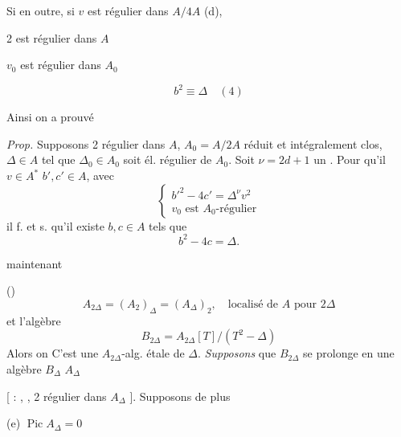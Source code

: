 \documentclass[11pt,a4paper]{article}
\begin{document}
Si en outre, si  $v$  est régulier dans $A/4A$ (d), \struck{\ill{}}

2 est régulier dans $A$

$v_0$ est régulier dans $A_0$


\[
  b^2 \equiv \Delta \quad (4)
\]



Ainsi on a prouvé

\emph{Prop.} Supposons 2 régulier dans $A$, $A_0 = A/2A$ réduit et intégralement clos, $\Delta \in A$ tel que $\Delta_0 \in A_0$ soit él. régulier de $A_0$. Soit $\nu = 2d + 1$ un   . Pour qu'il  $v \in A^*$  $b', c' \in A$, avec
\[
  \begin{cases}
    b'^2 - 4c' = \Delta^{\nu} v^2 \\
    v_0 \text{ est } A_0\text{-régulier}
  \end{cases}
\]
il f. et s. qu'il existe $b, c \in A$ tels que
\[
  b^2 - 4c = \Delta .
\]

  maintenant  

()
\[
  A_{2\Delta} = (A_2)_\Delta = (A_\Delta)_2 , \quad \text{localisé de } A \text{ pour } 2\Delta
\]
et l'algèbre
\[
  B_{2\Delta} = A_{2\Delta}[T] / (T^2 - \Delta)
\]
Alors on   C'est une $A_{2\Delta}$-alg. étale \ill{} de $\Delta$.  \emph{Supposons} que $B_{2\Delta}$ se prolonge  en une algèbre $B_\Delta$  $A_\Delta$  \struck{\ill{}}

[  : , \ill{}, 2  régulier dans $A_\Delta$ \ill{}]. Supposons de plus

(e) $\operatorname{Pic} A_\Delta = 0$

\end{document}
